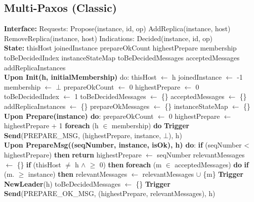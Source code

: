 \documentclass[sigconf]{acmart}
\begin{document}
\subsection{Multi-Paxos (Classic)}
\begin{algorithmic}[1]
\small
\State \textbf{Interface:}
\State \quad Requests:
\State \quad \quad Propose(instance, id, op)
\State \quad \quad AddReplica(instance, host)
\State \quad \quad RemoveReplica(instance, host)
\State \quad Indications:
\State \quad \quad Decided(instance, id, op)\\

\State \textbf{State:}
\State \quad thisHost 
\State \quad joinedInstance 
\State \quad prepareOkCount 
\State \quad highestPrepare 
\State \quad membership 
\State \quad toBeDecidedIndex 
\State \quad instanceStateMap 
\State \quad toBeDecidedMessages 
\State \quad acceptedMessages 
\State \quad addReplicaInstances  \\

\State \textbf{Upon Init(h, initialMembership)} do:
\State \quad thisHost $\gets$ h
\State \quad joinedInstance $\gets$ -1
\State \quad membership $\gets$ $\bot$
\State \quad prepareOkCount $\gets$ 0
\State \quad highestPrepare $\gets$ 0
\State \quad toBeDecidedIndex $\gets$ 1
\State \quad toBeDecidedMessages $\gets$ \{\}
\State \quad acceptedMessages $\gets$ \{\}
\State \quad addReplicaInstances $\gets$ \{\}
\State \quad prepareOkMessages $\gets$ \{\}
\State \quad instanceStateMap $\gets$ \{\} \\

\State \textbf{Upon Prepare(instance) do}:
\State \quad prepareOkCount $\gets$ 0
\State \quad highestPrepare $\gets$ highestPrepare + 1
\State \quad \textbf{foreach} (h $\in$ membership) \textbf{do}
\State \quad \quad \textbf{Trigger Send}(PREPARE\_MSG, (highestPrepare, instance, $\bot$), h) \\

\State \textbf{Upon PrepareMsg((seqNumber, instance, isOk), h) do}:
\State \quad \textbf{if} (seqNumber < highestPrepare) \textbf{then}
\State \quad \quad \textbf{return}
\State \quad highestPrepare $\gets$ seqNumber
\State \quad relevantMessages $\gets$ \{\}
\State \quad \textbf{if} (thisHost $\neq$ h $\land$  $\geq$ 0) \textbf{then}
\State \quad \quad \textbf{foreach} (m $\in$ acceptedMessages) \textbf{do}
\State \quad \quad \quad \textbf{if} (m. $\geq$ instance) \textbf{then}
\State \quad \quad \quad \quad relevantMessages $\gets$ relevantMessages $\cup$ \{m\}
\State \quad \quad \textbf{Trigger NewLeader}(h)
\State \quad \quad toBeDecidedMessages $\gets$ \{\}
\State \quad \textbf{Trigger Send}(PREPARE\_OK\_MSG, (highestPrepare, relevantMessages), h) \\


\end{algorithmic}
\end{document}
